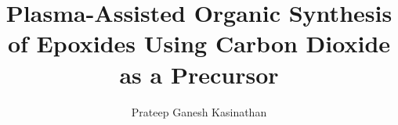 \documentclass[a4paper,12pt,twoside]{report}
\begin{document}
\title{\LARGE {\bf Plasma-Assisted Organic Synthesis of Epoxides Using Carbon Dioxide as a Precursor}\\
 \vspace*{6mm}
}

\author{Prateep Ganesh Kasinathan}

\normallinespacing
\maketitle

\preface
%

\body









%

\appendix






\end{document}
